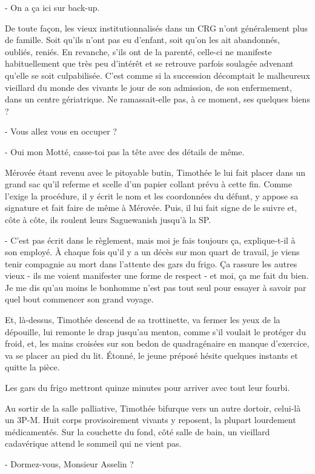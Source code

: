 - On a ça ici sur back-up.

De toute façon, les vieux institutionnalisés dans un CRG n’ont généralement plus de famille. Soit qu’ils n’ont pas eu d’enfant, soit qu’on les ait abandonnés, oubliés, reniés. En revanche, s’ils ont de la parenté, celle-ci ne manifeste habituellement que très peu d’intérêt et se retrouve parfois soulagée advenant qu’elle se soit culpabilisée. C’est comme si la succession décomptait le malheureux vieillard du monde des vivants le jour de son admission, de son enfermement, dans un centre gériatrique. Ne ramassait-elle pas, à ce moment, ses quelques biens ?

- Vous allez vous en occuper ?

- Oui mon Motté, casse-toi pas la tête avec des détails de même.

Mérovée étant revenu avec le pitoyable butin, Timothée le lui fait placer dans un grand sac qu’il referme et scelle d’un papier collant prévu à cette fin. Comme l’exige la procédure, il y écrit le nom et les coordonnées du défunt, y appose sa signature et fait faire de même à Mérovée. Puis, il lui fait signe de le suivre et, côte à côte, ils roulent leurs Saguewanish jusqu’à la SP.

- C’est pas écrit dans le règlement, mais moi je fais toujours ça, explique-t-il à son employé. À chaque fois qu’il y a un décès sur mon quart de travail, je viens tenir compagnie au mort dans l’attente des gars du frigo. Ça rassure les autres vieux - ils me voient manifester une forme de respect - et moi, ça me fait du bien. Je me dis qu’au moins le bonhomme n’est pas tout seul pour essayer à savoir par quel bout commencer son grand voyage.

Et, là-dessus, Timothée descend de sa trottinette, va fermer les yeux de la dépouille, lui remonte le drap jusqu’au menton, comme s’il voulait le protéger du froid, et, les mains croisées sur son bedon de quadragénaire en manque d’exercice, va se placer au pied du lit. Étonné, le jeune préposé hésite quelques instants et quitte la pièce.

Les gars du frigo mettront quinze minutes pour arriver avec tout leur fourbi.

Au sortir de la salle palliative, Timothée bifurque vers un autre dortoir, celui-là un 3P-M. Huit corps provisoirement vivants y reposent, la plupart lourdement médicamentés. Sur la couchette du fond, côté salle de bain, un vieillard cadavérique attend le sommeil qui ne vient pas.

- Dormez-vous, Monsieur Asselin ?

